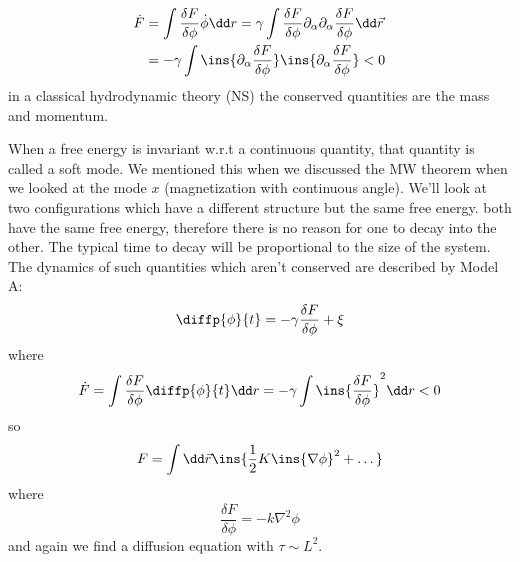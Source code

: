 \begin{description}
\begin{align}
		\dot F &= \int\frac{\delta F}{\delta \phi}\dot\phi\dd r = \gamma\int\frac{\delta F}{\delta \phi}\partial_\alpha\partial_\alpha\frac{\delta F}{\delta\phi}\dd \vec{r}\\
		&= -\gamma\int\ins{\partial_\alpha\frac{\delta F}{\delta\phi}}\ins{\partial_\alpha\frac{\delta F}{\delta\phi}}<0
	\end{align}
	in a classical hydrodynamic theory (NS) the conserved quantities are the mass and momentum.
	\item[Soft/Goldstone Mode] When a free energy is invariant w.r.t a continuous quantity, that quantity is called a soft mode. We mentioned this when we discussed the MW theorem when we looked at the mode $x$ (magnetization with continuous angle). We'll look at two configurations which have a different structure but the same free energy. both have the same free energy, therefore there is no reason for one to decay into the other. The typical time to decay will be proportional to the size of the system. The dynamics of such quantities which aren't conserved are described by Model A:
	\begin{equation}
		\diffp{\phi}{t} = -\gamma\frac{\delta F}{\delta \phi}+\xi
	\end{equation}
	where
	\begin{equation}
		\dot F = \int\frac{\delta F}{\delta \phi}\diffp{\phi}{t}\dd r = -\gamma\int\ins{\frac{\delta F}{\delta \phi}}^2\dd r < 0
	\end{equation}
	so
	\begin{equation}
		F = \int\dd \vec{r}\ins{\frac{1}{2}K\ins{\nabla\phi}^2+\dots}
	\end{equation}
	where
	\begin{equation}
		\frac{\delta F}{\delta\phi} = -k\nabla^2\phi
	\end{equation}
	and again we find a diffusion equation with $\tau\sim L^2$.
\end{description}
